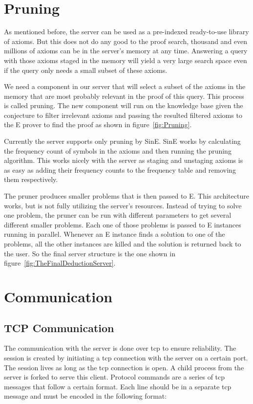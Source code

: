 \section{Pruning}
As mentioned before, the server can be used as a pre-indexed ready-to-use library of axioms. But this does not do any good to the proof search, thousand and even millions of axioms can be in the server's memory at any time. Answering a query with those axioms staged in the memory will yield a very large search space even if the query only needs a small subset of these axioms.

We need a component in our server that will select a subset of the axioms in the memory that are most probably relevant in the proof of this query. This process is called pruning. The new component will run on the knowledge base given the conjecture to filter irrelevant axioms and passing the resulted filtered axioms to the E prover to find the proof as shown in figure~\ref{fig:Pruning}.


Currently the server supports only pruning by SinE. SinE works by calculating the frequency count of symbols in the axioms and then running the pruning algorithm. This works nicely with the server as staging and unstaging axioms is as easy as adding their frequency counts to the frequency table and removing them respectively.

The pruner produces smaller problems that is then passed to E. This architecture works, but is not fully utilizing the server's resources. Instead of trying to solve one problem, the pruner can be run with different parameters to get several different smaller problems. Each one of those problems is passed to E instances running in parallel. Whenever an E instance finds a solution to one of the problems, all the other instances are killed and the solution is returned back to the user. So the final server structure is the one shown in figure~\ref{fig:TheFinalDeductionServer}.


\section{Communication}
\subsection{TCP Communication}\label{subsec:tcpCommunication}
The communication with the server is done over \ac{tcp} to ensure reliability. The session is created by initiating a \ac{tcp} connection with the server on a certain port. The session lives as long as the \ac{tcp} connection is open. A child process from the server is forked to serve this client. Protocol commands are a series of \ac{tcp} messages that follow a certain format. Each line should be in a separate \ac{tcp} message and must be encoded in the following format:

